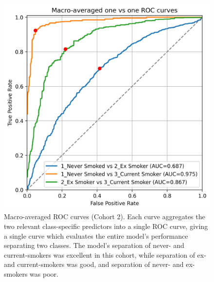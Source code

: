 \documentclass{article} %
\begin{document}
\begin{figure}[p]
    \centering
    \includegraphics[width=0.7\linewidth]{cohort2/test_macro_ovo_roc.png}
    \caption[Macro-averaged ROC curves (Cohort 2)]{Macro-averaged ROC curves (Cohort 2). Each curve aggregates the two relevant class-specific predictors into a single ROC curve, giving a single curve which evaluates the entire model's performance separating two classes. The model's separation of never- and current-smokers was excellent in this cohort, while separation of ex- and current-smokers was good, and separation of never- and ex-smokers was poor.}
    \label{fig:cohort2-macro-rocs}
\end{figure}
\end{document}
